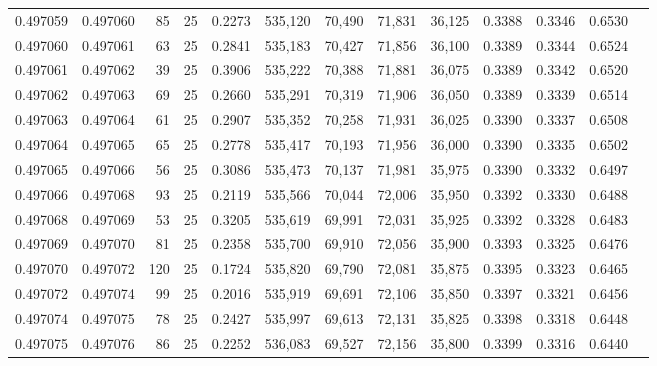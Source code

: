 \begin{tabular}{rrrrrrrrrrrrr}
0.497059 & 0.497060 &    85 &  25 &                                     0.2273 & 535,120 &  70,490 &  71,831 &  36,125 & 0.3388 & 0.3346 & 0.6530 \\
0.497060 & 0.497061 &    63 &  25 &                                     0.2841 & 535,183 &  70,427 &  71,856 &  36,100 & 0.3389 & 0.3344 & 0.6524 \\
0.497061 & 0.497062 &    39 &  25 &                                     0.3906 & 535,222 &  70,388 &  71,881 &  36,075 & 0.3389 & 0.3342 & 0.6520 \\
0.497062 & 0.497063 &    69 &  25 &                                     0.2660 & 535,291 &  70,319 &  71,906 &  36,050 & 0.3389 & 0.3339 & 0.6514 \\
0.497063 & 0.497064 &    61 &  25 &                                     0.2907 & 535,352 &  70,258 &  71,931 &  36,025 & 0.3390 & 0.3337 & 0.6508 \\
0.497064 & 0.497065 &    65 &  25 &                                     0.2778 & 535,417 &  70,193 &  71,956 &  36,000 & 0.3390 & 0.3335 & 0.6502 \\
0.497065 & 0.497066 &    56 &  25 &                                     0.3086 & 535,473 &  70,137 &  71,981 &  35,975 & 0.3390 & 0.3332 & 0.6497 \\
0.497066 & 0.497068 &    93 &  25 &                                     0.2119 & 535,566 &  70,044 &  72,006 &  35,950 & 0.3392 & 0.3330 & 0.6488 \\
0.497068 & 0.497069 &    53 &  25 &                                     0.3205 & 535,619 &  69,991 &  72,031 &  35,925 & 0.3392 & 0.3328 & 0.6483 \\
0.497069 & 0.497070 &    81 &  25 &                                     0.2358 & 535,700 &  69,910 &  72,056 &  35,900 & 0.3393 & 0.3325 & 0.6476 \\
0.497070 & 0.497072 &   120 &  25 &                                     0.1724 & 535,820 &  69,790 &  72,081 &  35,875 & 0.3395 & 0.3323 & 0.6465 \\
0.497072 & 0.497074 &    99 &  25 &                                     0.2016 & 535,919 &  69,691 &  72,106 &  35,850 & 0.3397 & 0.3321 & 0.6456 \\
0.497074 & 0.497075 &    78 &  25 &                                     0.2427 & 535,997 &  69,613 &  72,131 &  35,825 & 0.3398 & 0.3318 & 0.6448 \\
0.497075 & 0.497076 &    86 &  25 &                                     0.2252 & 536,083 &  69,527 &  72,156 &  35,800 & 0.3399 & 0.3316 & 0.6440 \\

\end{tabular}
